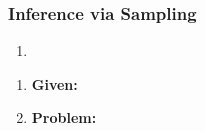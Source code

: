\subsubsection{Inference via Sampling}
\begin{process}
    \begin{enumerate}
        \item 
    \end{enumerate}
\end{process}

\begin{example}
    \begin{enumerate}
        \item \textbf{Given:}
        \item \textbf{Problem:}
    \end{enumerate}
\end{example}